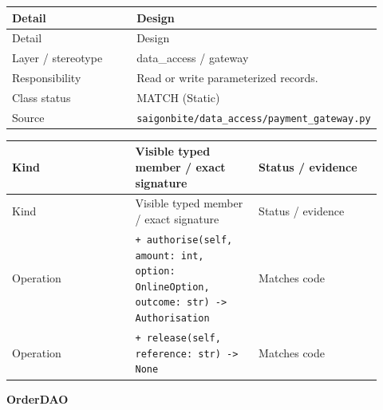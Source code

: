 \begin{longtable}{>{\raggedright\arraybackslash}p{0.4600\linewidth}>{\raggedright\arraybackslash}p{0.4600\linewidth}}
Detail & Design \\
\hline\endfirsthead
Detail & Design \\
\hline\endhead
Layer / stereotype & data\_access / \guillemotleft{}gateway\guillemotright{} \\
Responsibility & Read or write parameterized records. \\
Class status & MATCH (Static) \\
Source & \texttt{saigonbite/\allowbreak{}data\_\allowbreak{}access/\allowbreak{}payment\_\allowbreak{}gateway.\allowbreak{}py} \\
\end{longtable}
\begin{longtable}{>{\raggedright\arraybackslash}p{0.3067\linewidth}>{\raggedright\arraybackslash}p{0.3067\linewidth}>{\raggedright\arraybackslash}p{0.3067\linewidth}}
Kind & Visible typed member / exact signature & Status / evidence \\
\hline\endfirsthead
Kind & Visible typed member / exact signature & Status / evidence \\
\hline\endhead
Operation & \texttt{+ authorise(self, amount: int, option: OnlineOption, outcome: str) -\textgreater{} Authorisation} & Matches code \\
Operation & \texttt{+ release(self, reference: str) -\textgreater{} None} & Matches code \\
\end{longtable}
\textbf{OrderDAO}

